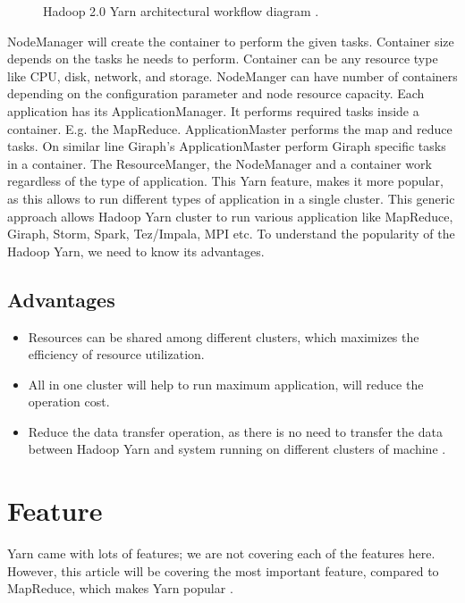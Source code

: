 \documentclass[9pt,twocolumn,twoside]{../../styles/osajnl}
\begin{document}
\begin{figure}[htbp]
	\centering
	\caption{Hadoop 2.0 Yarn architectural workflow diagram \cite{www-1}. }
	\label{fig:false-color}
\end{figure}

NodeManager will create the container to perform the given tasks. Container size depends on the tasks he needs to perform. Container can be any resource type like CPU, disk, network, and storage. NodeManger can have number of containers depending on the configuration parameter and node resource capacity. 
Each application has its ApplicationManager. It performs required tasks inside a container. E.g. the MapReduce. ApplicationMaster performs the map and reduce tasks. On similar line Giraph’s ApplicationMaster perform Giraph specific tasks in a container. The ResourceManger, the NodeManager and a container work regardless of the type of application. This Yarn feature, makes it more popular, as this allows to run different types of application in a single cluster. This generic approach allows Hadoop Yarn cluster to run various application like MapReduce, Giraph, Storm, Spark, Tez/Impala, MPI etc. To understand the popularity of the Hadoop Yarn, we need to know its advantages.

\subsection{Advantages} 
\begin{itemize}
	\item Resources can be shared among different clusters, which maximizes the efficiency of resource utilization.
	\item All in one cluster will help to run maximum application, will reduce the operation cost.
	\item Reduce the data transfer operation, as there is no need to transfer the data between Hadoop Yarn and system running on different clusters of machine \cite{www-4}.
\end{itemize}
	
\section{Feature}

Yarn came with lots of features; we are not covering each of the features here. However, this article will be covering the most important feature, compared to MapReduce, which makes Yarn popular \cite{www-4}.
\end{document}

